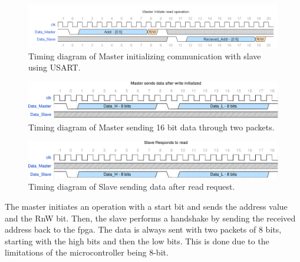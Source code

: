 \documentclass[main.tex]{subfiles}
\begin{document}
\begin{figure}[!htpb]
    \centering
    \includegraphics[width=15cm, scale=1]{images/MasterInitRead.png}
    \caption{Timing diagram of Master initializing communication with slave using USART.}
    \label{fig: master_init}
\end{figure}
\FloatBarrier

\begin{figure}[!htpb]
    \centering
    \includegraphics[width=15cm, scale=1]{images/MasterSendData-eps-converted-to.pdf}
    \caption{Timing diagram of Master sending 16 bit data through two packets.}
    \label{fig: master_send}
\end{figure}
\FloatBarrier

\begin{figure}[!htpb]
    \centering
    \includegraphics[width=15cm, scale=1]{images/SlaveRespondRead-eps-converted-to.pdf}
    \caption{Timing diagram of Slave sending data after read request.}
    \label{fig: slave_read}
\end{figure}
\FloatBarrier

The master initiates an operation with a start bit and sends the address value and the RnW bit. Then, the slave performs a handshake by sending the received address back to the \gls{fpga}. The data is always sent with two packets of 8 bits, starting with the high bits and then the low bits. This is done due to the limitations of the microcontroller being 8-bit. 


\end{document}
